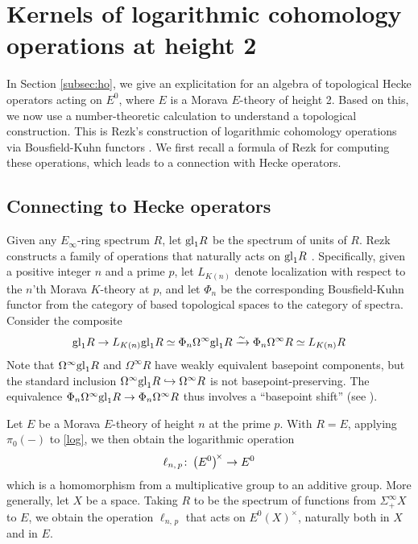 \documentclass{gtpart}
\theoremstyle{definition}
\theoremstyle{remark}
\def\co{\colon\thinspace}
\renewcommand{\=}{\approx}
\renewcommand{\-}{\sim}
\newcommand{\gl}{{\rm gl}}
\numberwithin{equation}{section}
\begin{document}
\section{Kernels of logarithmic cohomology operations at height 2}
\label{sec:kerlog}

In Section \ref{subsec:ho}, we give an explicitation for an algebra of 
topological Hecke operators acting on $E^0$, where $E$ is a Morava $E$-theory of 
height 2.  Based on this, we now use a number-theoretic calculation to 
understand a topological construction.  This is Rezk's construction of 
logarithmic cohomology operations via Bousfield-Kuhn functors \cite{log}.  We 
first recall a formula of Rezk for computing these operations, which leads to a 
connection with Hecke operators.  



\subsection{Connecting to Hecke operators}

Given any $E_\infty$-ring spectrum $R$, let $\gl_1 R$ be the spectrum of units 
of $R$.  Rezk constructs a family of operations that naturally acts on $\gl_1 R$ 
\cite[Definition 3.6]{log}.  Specifically, given a positive integer $n$ and a 
prime $p$, let $L_{K(n)}$ denote localization with respect to the $n$'th Morava 
$K$-theory at $p$, and let $\Phi_n$ be the corresponding Bousfield-Kuhn functor 
from the category of based topological spaces to the category of spectra.  
Consider the composite 
\begin{equation}
 \label{log}
 \gl_1 R \to L_{K(n)} \gl_1 R \simeq \Phi_n \Omega^\infty \gl_1 R 
 \xrightarrow{\sim} \Phi_n \Omega^\infty R \simeq L_{K(n)} R 
\end{equation}
Note that $\Omega^\infty \gl_1 R$ and $\Omega^\infty R$ have weakly equivalent 
basepoint components, but the standard inclusion 
$\Omega^\infty \gl_1 R \hookrightarrow \Omega^\infty R$ is not 
basepoint-preserving.  The equivalence 
$\Phi_n \Omega^\infty \gl_1 R \to \Phi_n \Omega^\infty R$ thus involves a 
``basepoint shift'' (see \cite[3.4]{log}).  

Let $E$ be a Morava $E$-theory of height $n$ at the prime $p$.  With $R = E$, 
applying $\pi_0(-)$ to \eqref{log}, we then obtain the logarithmic operation 
\[
 \ell_{n,\,p} \co \big( E^0 \big)^{\!\times} \to E^0 
\]
which is a homomorphism from a multiplicative group to an additive group.  More 
generally, let $X$ be a space.  Taking $R$ to be the spectrum of functions from 
$\Sigma^\infty_+ X$ to $E$, we obtain the operation $\ell_{n,\,p}$ that acts on 
$E^0(X)^\times$, naturally both in $X$ and in $E$.  
\end{document}
